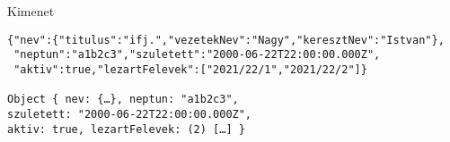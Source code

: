 \begin{frame}
  \begin{exampleblock}{}
    \footnotesize
    \vspace{-.3cm}
    
    \vspace{-.3cm}
  \end{exampleblock}
\end{frame}

\begin{frame}[fragile]
  \begin{block}{Kimenet}
    \begin{verbatim}
{"nev":{"titulus":"ifj.","vezetekNev":"Nagy","keresztNev":"Istvan"},
 "neptun":"a1b2c3","szuletett":"2000-06-22T22:00:00.000Z",
 "aktiv":true,"lezartFelevek":["2021/22/1","2021/22/2"]}

Object { nev: {…}, neptun: "a1b2c3", 
szuletett: "2000-06-22T22:00:00.000Z", 
aktiv: true, lezartFelevek: (2) […] }
\end{verbatim}
  \end{block}
\end{frame}